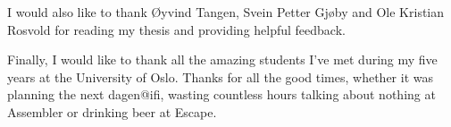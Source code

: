 \documentclass[USenglish]{ifimaster}
\begin{document}
 I would also like to thank Øyvind Tangen, Svein Petter Gjøby and Ole Kristian
 Rosvold for reading my thesis and providing helpful feedback.

Finally, I would like to thank all the amazing students I've met during my five
years at the University of Oslo. Thanks for all the good times, whether it was
planning the next dagen@ifi, wasting countless hours talking about nothing at
Assembler or drinking beer at Escape.


\tableofcontents

\glsresetall










\pagebreak
\printbibliography{}
\printglossaries{}


\end{document}
